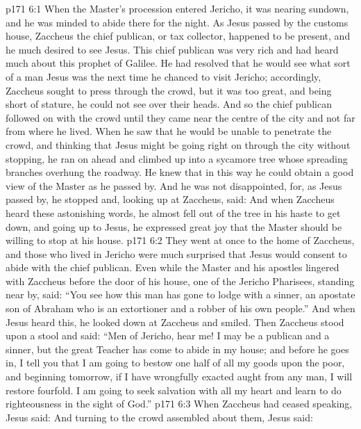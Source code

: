 \vs p171 6:1 When the Master’s procession entered Jericho, it was nearing sundown, and he was minded to abide there for the night. As Jesus passed by the customs house, Zaccheus the chief publican, or tax collector, happened to be present, and he much desired to see Jesus. This chief publican was very rich and had heard much about this prophet of Galilee. He had resolved that he would see what sort of a man Jesus was the next time he chanced to visit Jericho; accordingly, Zaccheus sought to press through the crowd, but it was too great, and being short of stature, he could not see over their heads. And so the chief publican followed on with the crowd until they came near the centre of the city and not far from where he lived. When he saw that he would be unable to penetrate the crowd, and thinking that Jesus might be going right on through the city without stopping, he ran on ahead and climbed up into a sycamore tree whose spreading branches overhung the roadway. He knew that in this way he could obtain a good view of the Master as he passed by. And he was not disappointed, for, as Jesus passed by, he stopped and, looking up at Zaccheus, said:  And when Zaccheus heard these astonishing words, he almost fell out of the tree in his haste to get down, and going up to Jesus, he expressed great joy that the Master should be willing to stop at his house.
\vs p171 6:2 They went at once to the home of Zaccheus, and those who lived in Jericho were much surprised that Jesus would consent to abide with the chief publican. Even while the Master and his apostles lingered with Zaccheus before the door of his house, one of the Jericho Pharisees, standing near by, said: “You see how this man has gone to lodge with a sinner, an apostate son of Abraham who is an extortioner and a robber of his own people.” And when Jesus heard this, he looked down at Zaccheus and smiled. Then Zaccheus stood upon a stool and said: “Men of Jericho, hear me! I may be a publican and a sinner, but the great Teacher has come to abide in my house; and before he goes in, I tell you that I am going to bestow one half of all my goods upon the poor, and beginning tomorrow, if I have wrongfully exacted aught from any man, I will restore fourfold. I am going to seek salvation with all my heart and learn to do righteousness in the sight of God.”
\vs p171 6:3 When Zaccheus had ceased speaking, Jesus said:  And turning to the crowd assembled about them, Jesus said: 
